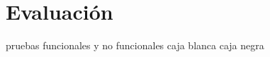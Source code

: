 \chapter{Evaluación}
\label{chap:evaluación}

pruebas funcionales y no funcionales
caja blanca
caja negra
